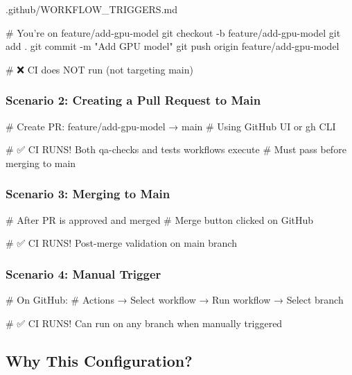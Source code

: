 \begin{relocated}{.github/WORKFLOW_TRIGGERS.md}
\begin{textblock}
# You're on feature/add-gpu-model
git checkout -b feature/add-gpu-model
git add .
git commit -m "Add GPU model"
git push origin feature/add-gpu-model

# ❌ CI does NOT run (not targeting main)
\end{textblock}

\subsubsection{Scenario 2: Creating a Pull Request to Main}\label{um:flow:workflow-triggers:scenario-2-creating-a-pull-request-to-main}

\begin{textblock}
# Create PR: feature/add-gpu-model → main
# Using GitHub UI or gh CLI

# ✅ CI RUNS! Both qa-checks and tests workflows execute
# Must pass before merging to main
\end{textblock}

\subsubsection{Scenario 3: Merging to Main}\label{um:flow:workflow-triggers:scenario-3-merging-to-main}

\begin{textblock}
# After PR is approved and merged
# Merge button clicked on GitHub

# ✅ CI RUNS! Post-merge validation on main branch
\end{textblock}

\subsubsection{Scenario 4: Manual Trigger}\label{um:flow:workflow-triggers:scenario-4-manual-trigger}

\begin{textblock}
# On GitHub:
# Actions → Select workflow → Run workflow → Select branch

# ✅ CI RUNS! Can run on any branch when manually triggered
\end{textblock}

\subsection{Why This Configuration?}\label{um:flow:workflow-triggers:why-this-configuration}


\end{relocated}
